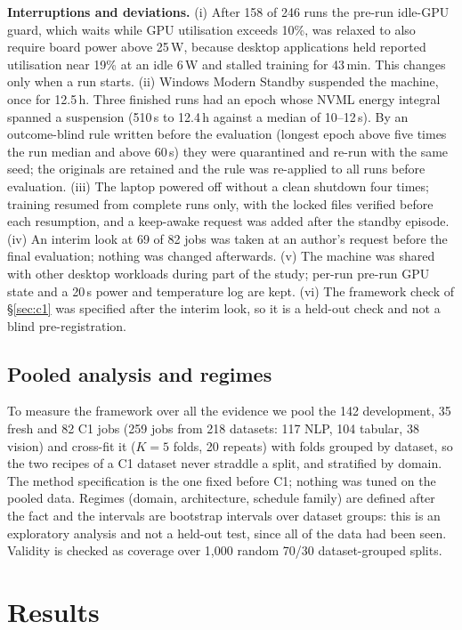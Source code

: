 \documentclass[3p,twocolumn,10pt]{elsarticle}
\theoremstyle{definition}
\begin{document}
\textbf{Interruptions and deviations.} (i) After 158 of 246 runs the pre-run idle-GPU guard, which waits while GPU utilisation exceeds 10\%, was relaxed to also require board power above 25\,W, because desktop applications held reported utilisation near 19\% at an idle 6\,W and stalled training for 43\,min. This changes only when a run starts. (ii) Windows Modern Standby suspended the machine, once for 12.5\,h. Three finished runs had an epoch whose NVML energy integral spanned a suspension (510\,s to 12.4\,h against a median of 10--12\,s). By an outcome-blind rule written before the evaluation (longest epoch above five times the run median and above 60\,s) they were quarantined and re-run with the same seed; the originals are retained and the rule was re-applied to all runs before evaluation. (iii) The laptop powered off without a clean shutdown four times; training resumed from complete runs only, with the locked files verified before each resumption, and a keep-awake request was added after the standby episode. (iv) An interim look at 69 of 82 jobs was taken at an author's request before the final evaluation; nothing was changed afterwards. (v) The machine was shared with other desktop workloads during part of the study; per-run pre-run GPU state and a 20\,s power and temperature log are kept. (vi) The framework check of \S\ref{sec:c1} was specified after the interim look, so it is a held-out check and not a blind pre-registration.

\subsection{Pooled analysis and regimes}
\label{sec:pooledsetup}
To measure the framework over all the evidence we pool the 142 development, 35 fresh and 82 C1 jobs (259 jobs from 218 datasets: 117 NLP, 104 tabular, 38 vision) and cross-fit it ($K{=}5$ folds, 20 repeats) with folds grouped by dataset, so the two recipes of a C1 dataset never straddle a split, and stratified by domain. The method specification is the one fixed before C1; nothing was tuned on the pooled data. Regimes (domain, architecture, schedule family) are defined after the fact and the intervals are bootstrap intervals over dataset groups: this is an exploratory analysis and not a held-out test, since all of the data had been seen. Validity is checked as coverage over 1{,}000 random 70/30 dataset-grouped splits.

\section{Results}
\label{sec:results}
\end{document}
